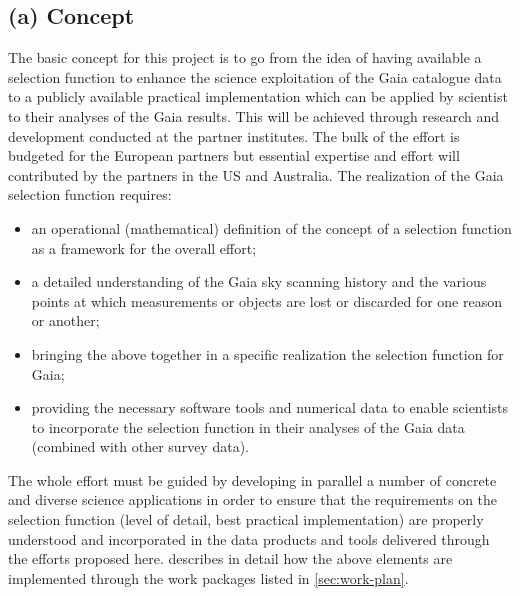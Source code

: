 \subsection{(a) Concept}
\label{sec:concept}

The basic concept for this project is to go from the idea of having available a selection function to enhance the science exploitation of the Gaia catalogue data to a publicly available practical implementation which can be applied by scientist to their analyses of the Gaia results. This will be achieved through research and development conducted at the partner institutes. The bulk of the effort is budgeted for the European partners but essential expertise and effort will contributed by the partners in the US and Australia. The realization of the Gaia selection function requires: 
\begin{itemize}
    \item an operational (mathematical) definition of the concept of a selection function as a framework for the overall effort;
    \item a detailed understanding of the Gaia sky scanning history and the various points at which measurements or objects are lost or discarded for one reason or another;
    \item bringing the above together in a specific realization the selection function for Gaia;
    \item providing the necessary software tools and numerical data to enable scientists to incorporate the selection function in their analyses of the Gaia data (combined with other survey data).
\end{itemize}
The whole effort must be guided by developing in parallel a number of concrete and diverse science applications in order to ensure that the requirements on the selection function (level of detail, best practical implementation) are properly understood and incorporated in the data products and tools delivered through the efforts proposed here.  describes in detail how the above elements are implemented through the work packages listed in \ref{sec:work-plan}.

